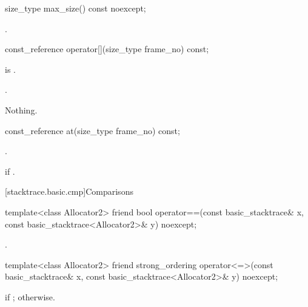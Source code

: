 %
\begin{itemdecl}
size_type max_size() const noexcept;
\end{itemdecl}

\begin{itemdescr}
\pnum
\returns
{}.
\end{itemdescr}

%
\begin{itemdecl}
const_reference operator[](size_type frame_no) const;
\end{itemdecl}

\begin{itemdescr}
\pnum
\expects
{} is .

\pnum
\returns
{}.

\pnum
\throws
Nothing.
\end{itemdescr}

%
\begin{itemdecl}
const_reference at(size_type frame_no) const;
\end{itemdecl}

\begin{itemdescr}
\pnum
\returns
{}.

\pnum
\throws
{} if .
\end{itemdescr}

[stacktrace.basic.cmp]{Comparisons}

%
\begin{itemdecl}
template<class Allocator2>
friend bool operator==(const basic_stacktrace& x, const basic_stacktrace<Allocator2>& y) noexcept;
\end{itemdecl}

\begin{itemdescr}
\pnum
\returns
{}.
\end{itemdescr}

%
\begin{itemdecl}
template<class Allocator2>
friend strong_ordering
  operator<=>(const basic_stacktrace& x, const basic_stacktrace<Allocator2>& y) noexcept;
\end{itemdecl}

\begin{itemdescr}
\pnum
\returns
{} if ;
otherwise.
\end{itemdescr}

